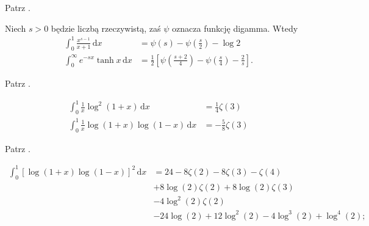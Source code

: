 
\begin{solution}
    Patrz \cite[s. 2]{valean19}.
\end{solution}

\begin{problem_with_solution}
    \label{valean_1_5}%
    Niech $s > 0$ będzie liczbą rzeczywistą, zaś $\psi$ oznacza funkcję digamma.
    Wtedy
    \begin{align}
        \int_0^1 \frac{x^{s-1}}{x+1} \,\mathrm{d} x & = \psi(s) - \psi\left(\frac s2\right) - \log 2 \\
        \int_0^\infty e^{-sx} \tanh x \,\mathrm{d} x & = \frac 1 2 \left[\psi\left(\frac{s+2}{4}\right) - \psi \left(\frac s4 \right) - \frac 2 s\right]. 
    \end{align}
\end{problem_with_solution}


\begin{solution}
    Patrz \cite[s. 3]{valean19}.
\end{solution}

\begin{problem_with_solution}
    \label{valean_1_7}%
    \begin{align}
        \int_0^1 \frac{1}{x} \log^2 (1+x) \,\mathrm{d}x & = \frac{1}{4} \zeta(3) \\
        \int_0^1 \frac{1}{x} \log (1+x) \log (1-x) \,\mathrm{d}x & = -\frac{5}{8} \zeta(3)
    \end{align}
\end{problem_with_solution}


\begin{solution}
    Patrz \cite[s. 4]{valean19}.
\end{solution}

\begin{problem_with_solution}[]
    \label{valean_1_8}%
    \begin{align}
        \int_0^1 [\log(1+x) \log(1-x)]^2 \,\mathrm{d} x & =
        24 - 8 \zeta(2)- 8 \zeta(3) - \zeta(4) \\
        & + 8 \log(2)\zeta(2) + 8 \log(2)\zeta(3) \\
        & - 4 \log^2(2)\zeta(2) \\
        & - 24 \log(2) + 12 \log^2(2)- 4 \log^3(2) + \log^4(2); 
    \end{align}
\end{problem_with_solution}


